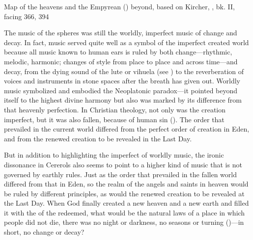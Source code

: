 {Map of the heavens and the Empyrean () beyond, based on
Kircher, , bk. II, facing 366, 394}

The music of the spheres was still the worldly, imperfect music of change and
decay.
In fact, music served quite well as a symbol of the imperfect created world
because all music known to human ears is ruled by both change---rhythmic,
melodic, harmonic; changes of style from place to place and across time---and
decay, from the dying sound of the lute or vihuela (see ) to
the reverberation of voices and instruments in stone spaces after the breath has
given out.
Worldly music symbolized and embodied the Neoplatonic paradox---it pointed
beyond itself to the highest divine harmony but also was marked by its
difference from that heavenly perfection.
In Christian theology, not only was the creation imperfect, but it was also
fallen,  because of human sin ().
The order that prevailed in the current world differed from the perfect order
of creation in Eden, and from the renewed creation to be revealed in the Last
Day.

But in addition to highlighting the imperfect of worldly music, the ironic
dissonance in Cererols also seems to point to a higher kind of music that is
not governed by earthly rules.
Just as the order that prevailed in the fallen world differed from that in
Eden, so the realm of the angels and saints in heaven would be ruled by
different principles, as would the renewed creation to be revealed at the Last
Day.
When God finally created a new heaven and a new earth and filled it with the
 of the redeemed, what would be the natural laws of a
place in which people did not die, there was no night or darkness, no seasons or
turning ()---in short, no change or decay?

